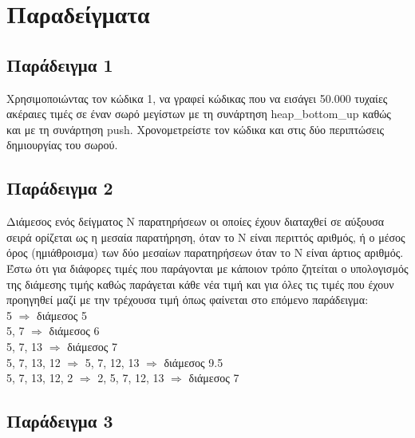 




\section{Παραδείγματα}
\subsection{Παράδειγμα 1}
Χρησιμοποιώντας τον κώδικα 1, να γραφεί κώδικας που να εισάγει 50.000 τυχαίες ακέραιες τιμές σε έναν σωρό μεγίστων με τη συνάρτηση heap\_bottom\_up καθώς και με τη συνάρτηση push. Χρονομετρείστε τον κώδικα και στις δύο περιπτώσεις δημιουργίας του σωρού.

\subsection{Παράδειγμα 2}
Διάμεσος ενός δείγματος Ν παρατηρήσεων οι οποίες έχουν διαταχθεί σε αύξουσα σειρά ορίζεται ως η μεσαία παρατήρηση, όταν το Ν είναι περιττός αριθμός, ή ο μέσος όρος (ημιάθροισμα) των δύο μεσαίων παρατηρήσεων όταν το Ν είναι άρτιος αριθμός. 
Έστω ότι για διάφορες τιμές που παράγονται με κάποιον τρόπο ζητείται ο υπολογισμός της διάμεσης  τιμής καθώς παράγεται κάθε νέα τιμή και για όλες τις τιμές που έχουν προηγηθεί μαζί με την τρέχουσα τιμή όπως φαίνεται στο επόμενο παράδειγμα:\\ 
5  $\Rightarrow$  διάμεσος 5\\
5, 7 $\Rightarrow$ διάμεσος 6\\
5, 7, 13 $\Rightarrow$ διάμεσος 7\\
5, 7, 13, 12 $\Rightarrow$ 5, 7, 12, 13 $\Rightarrow$ διάμεσος 9.5\\
5, 7, 13, 12, 2 $\Rightarrow$ 2, 5, 7, 12, 13 $\Rightarrow$ διάμεσος 7





\subsection{Παράδειγμα 3}

